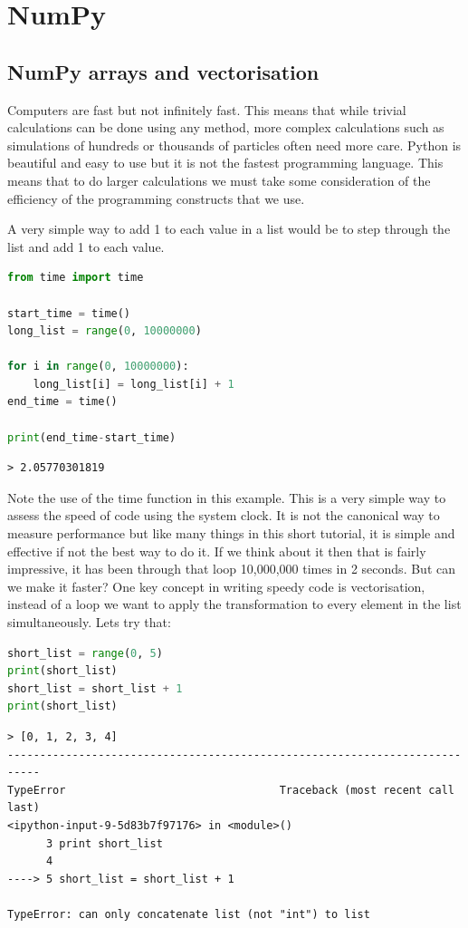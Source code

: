 \section{NumPy}
	\subsection{NumPy arrays and vectorisation}
	Computers are fast but not infinitely fast. This means that while trivial calculations can be done using any method, more complex calculations such as simulations of hundreds or thousands of particles often need more care. Python is beautiful and easy to use but it is not the fastest programming language. This means that to do larger calculations we must take some consideration of the efficiency of the programming constructs that we use.

	A very simple way to add 1 to each value in a list would be to step through the list and add 1 to each value.
	\begin{lstlisting}[language=Python]
from time import time

start_time = time()
long_list = range(0, 10000000)

for i in range(0, 10000000):
	long_list[i] = long_list[i] + 1
end_time = time()

print(end_time-start_time)\end{lstlisting}
	\begin{verbatim}> 2.05770301819\end{verbatim}

	Note the use of the time function in this example. This is a very simple way to assess the speed of code using the system clock. It is not the canonical way to measure performance but like many things in this short tutorial, it is simple and effective if not the best way to do it.
	If we think about it then that is fairly impressive, it has been through that loop 10,000,000 times in 2 seconds. But can we make it faster? One key concept in writing speedy code is vectorisation, instead of a loop we want to apply the transformation to every element in the list simultaneously. Lets try that:

	\begin{lstlisting}[language=Python]
short_list = range(0, 5)
print(short_list)
short_list = short_list + 1
print(short_list)\end{lstlisting}

	\begin{verbatim}
> [0, 1, 2, 3, 4]
---------------------------------------------------------------------------
TypeError                                 Traceback (most recent call last)
<ipython-input-9-5d83b7f97176> in <module>()
      3 print short_list
      4 
----> 5 short_list = short_list + 1

TypeError: can only concatenate list (not "int") to list\end{verbatim}

